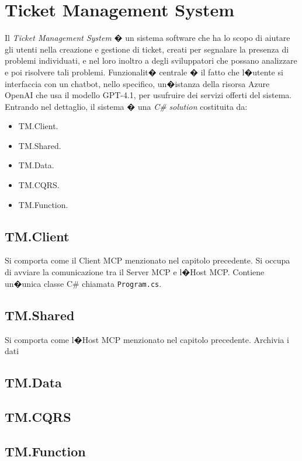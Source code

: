 \chapter{Ticket Management System}

Il \textit{Ticket Management System} � un sistema software che ha lo scopo di aiutare gli utenti nella creazione e gestione di ticket, creati per segnalare la presenza di problemi individuati, e nel loro inoltro a degli sviluppatori che possano analizzare e poi risolvere tali problemi. Funzionalit� centrale � il fatto che l�utente si interfaccia con un chatbot, nello specifico, un�istanza della risorsa Azure OpenAI che usa il modello GPT-4.1, per usufruire dei servizi offerti del sistema. Entrando nel dettaglio, il sistema � una \textit{C# solution} costituita da:
\begin{itemize} 
\item TM.Client.
\item TM.Shared.
\item TM.Data.
\item TM.CQRS. 
\item TM.Function.
\end{itemize}

\section{TM.Client}
Si comporta come il Client MCP menzionato nel capitolo precedente. Si occupa di avviare la comunicazione tra il Server MCP e l�Host MCP. Contiene un�unica classe C# chiamata \texttt{Program.cs}.

\section{TM.Shared}
Si comporta come l�Host MCP menzionato nel capitolo precedente. Archivia i dati 

\section{TM.Data}

\section{TM.CQRS}

\section{TM.Function}

